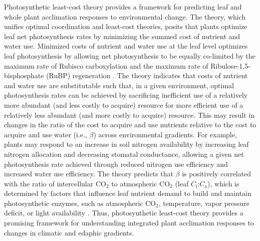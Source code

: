 Photosynthetic least-cost theory  provides a framework for predicting leaf and whole plant acclimation responses to environmental change. The theory, which unifies optimal coordination  and least-cost  theories, posits that plants optimize leaf net photosynthesis rates by minimizing the summed cost of nutrient and water use. Minimized costs of nutrient and water use at the leaf level optimizes leaf photosynthesis by allowing net photosynthesis to be equally co-limited by the maximum rate of Rubisco carboxylation and the maximum rate of Ribulose-1,5-bisphosphate (RuBP) regeneration . The theory indicates that costs of nutrient and water use are substitutable such that, in a given environment, optimal photosynthesis rates can be achieved by sacrificing inefficient use of a relatively more abundant (and less costly to acquire) resource for more efficient use of a relatively less abundant (and more costly to acquire) resource. This may result in changes in the ratio of the cost to acquire and use nutrients relative to the cost to acquire and use water (i.e., $\beta$) across environmental gradients. For example, plants may respond to an increase in soil nitrogen availability by increasing leaf nitrogen allocation and decreasing stomatal conductance, allowing a given net photosynthesis rate achieved through reduced nitrogen use efficiency and increased water use efficiency. The theory predicts that $\beta$ is positively correlated with the ratio of intercellular CO$_2$ to atmospheric CO$_2$ (leaf $C_\mathrm{i}$:$C_\mathrm{a}$), which is determined by factors that influence leaf nutrient demand to build and maintain photosynthetic enzymes, such as atmospheric CO$_2$, temperature, vapor pressure deficit, or light availability . Thus, photosynthetic least-cost theory provides a promising framework for understanding integrated plant acclimation responses to changes in climatic and edaphic gradients.

